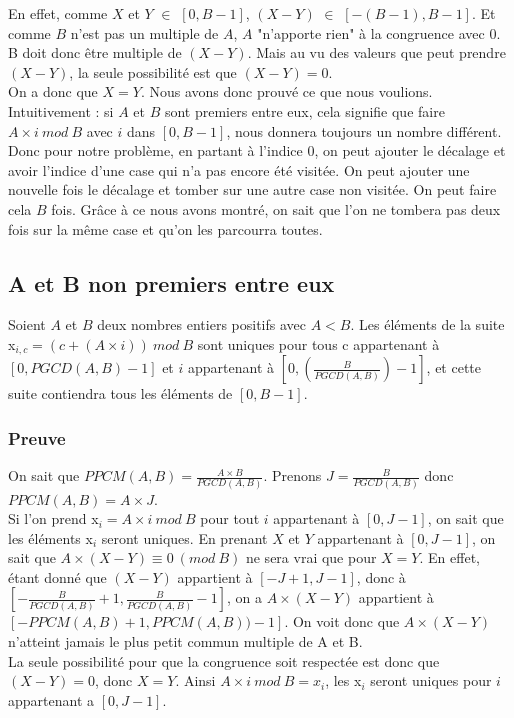 En effet, comme $X$ et $Y$ $\in$ $[0, B-1]$, $(X-Y)$ $\in$ $[-(B-1),B-1]$. Et comme $B$ n'est pas un multiple de $A$, $A$ "n'apporte rien" à la congruence avec 0. B doit donc être multiple de $(X-Y)$. Mais au vu des valeurs que peut prendre $(X-Y)$, la seule possibilité est que $(X-Y) = 0$.\\
On a donc que $X = Y$. Nous avons donc prouvé ce que nous voulions. \\

Intuitivement : si $A$ et $B$ sont premiers entre eux, cela signifie que faire $A\times i\ mod\ B$ avec $i$ dans $[0, B-1]$, nous donnera toujours un nombre différent. Donc pour notre problème, en partant à l'indice 0, on peut ajouter le décalage et avoir l'indice d'une case qui n'a pas encore été visitée. On peut ajouter une nouvelle fois le décalage et tomber sur une autre case non visitée. On peut faire cela $B$ fois. Grâce à ce nous avons montré, on sait que l'on ne tombera pas deux fois sur la même case et qu'on les parcourra toutes. 

\subsection*{A et B non premiers entre eux}
Soient $A$ et $B$ deux nombres entiers positifs avec $A < B$. Les éléments de la suite x$_{i,c} = (c + (A\times i))\ mod\ B$ sont uniques pour tous c appartenant à $[0, PGCD(A,B)-1]$ et $i$ appartenant à $[0, (\frac{B}{PGCD(A,B)})-1]$, et cette suite contiendra tous les éléments de $[0, B-1]$. \\

\subsubsection*{Preuve}

On sait que $PPCM(A,B) = \frac{A\times B}{PGCD(A,B)}$. Prenons $J = \frac{B}{PGCD(A,B)}$ donc $PPCM(A,B) = A\times J$.\\

Si l'on prend x$_{i} = A\times i\ mod\ B$ pour tout $i$ appartenant à $[0, J-1]$, on sait que les éléments x$_{i}$ seront uniques. En prenant $X$ et $Y$ appartenant à $[0, J-1]$, on sait que $A\times (X-Y) ≡ 0\ (mod\ B)$ ne sera vrai que pour $X=Y$. En effet, étant donné que $(X-Y)$ appartient à $[-J+1, J-1]$, donc à $[- \frac{B}{PGCD(A,B)} +1,\frac{B}{PGCD(A,B)} -1] $, on a $A\times (X-Y)$ appartient à $[- PPCM(A,B) +1, PPCM(A,B) )-1]$. On voit donc que $A\times (X-Y)$ n'atteint jamais le plus petit commun multiple de A et B.\\
La seule possibilité pour que la congruence soit respectée est donc que $(X-Y) = 0$, donc $X=Y$. Ainsi $A\times i\ mod\ B = x_{i}$, les x$_{i}$ seront uniques pour $i$ appartenant a $[0, J-1]$.\\

